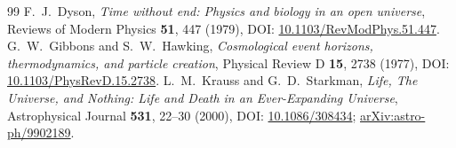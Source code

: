 \documentclass[12pt,a4paper]{article}
\begin{document}
\begin{thebibliography}{99}
F.~J.~Dyson, \emph{Time without end: Physics and biology in an open universe}, Reviews of Modern Physics \textbf{51}, 447 (1979), DOI: \href{https://doi.org/10.1103/RevModPhys.51.447}{10.1103/RevModPhys.51.447}.
G.~W.~Gibbons and S.~W.~Hawking, \emph{Cosmological event horizons, thermodynamics, and particle creation}, Physical Review D \textbf{15}, 2738 (1977), DOI: \href{https://doi.org/10.1103/PhysRevD.15.2738}{10.1103/PhysRevD.15.2738}.
L.~M.~Krauss and G.~D.~Starkman, \emph{Life, The Universe, and Nothing: Life and Death in an Ever-Expanding Universe}, Astrophysical Journal \textbf{531}, 22--30 (2000), DOI: \href{https://doi.org/10.1086/308434}{10.1086/308434}; \href{https://arxiv.org/abs/astro-ph/9902189}{arXiv:astro-ph/9902189}.
\end{thebibliography}
\end{document}
